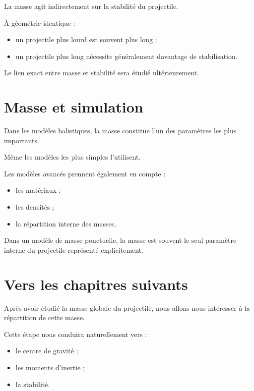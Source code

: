 La masse agit indirectement sur la stabilité du projectile.

À géométrie identique :

\begin{itemize}
    \item un projectile plus lourd est souvent plus long ;
    \item un projectile plus long nécessite généralement davantage de
    stabilisation.
\end{itemize}

Le lien exact entre masse et stabilité sera étudié ultérieurement.

\section{Masse et simulation}

Dans les modèles balistiques, la masse constitue l'un des paramètres les
plus importants.

Même les modèles les plus simples l'utilisent.

Les modèles avancés prennent également en compte :

\begin{itemize}
    \item les matériaux ;
    \item les densités ;
    \item la répartition interne des masses.
\end{itemize}

\begin{simulation}

Dans un modèle de masse ponctuelle, la masse est souvent le seul paramètre
interne du projectile représenté explicitement.

\end{simulation}

\section{Vers les chapitres suivants}

Après avoir étudié la masse globale du projectile, nous allons nous
intéresser à la répartition de cette masse.

Cette étape nous conduira naturellement vers :

\begin{itemize}
    \item le centre de gravité ;
    \item les moments d'inertie ;
    \item la stabilité.
\end{itemize}

